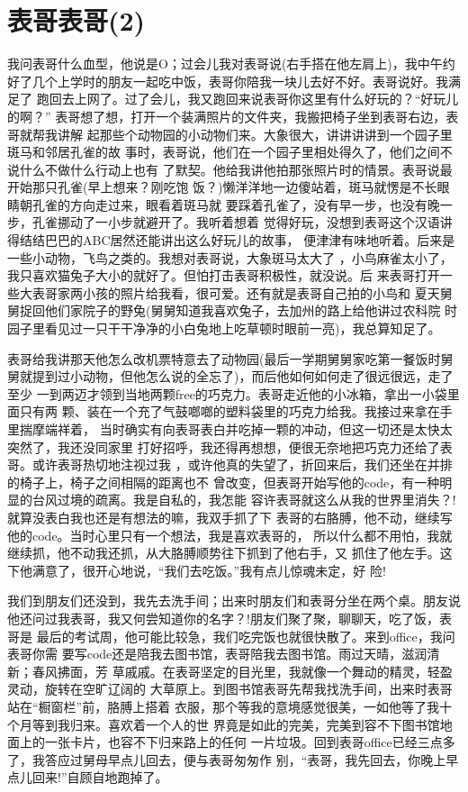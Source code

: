 \documentclass[12pt]{book}
\begin{document}
\section{表哥表哥(2)}
\label{sec-7-4}

       我问表哥什么血型，他说是O；过会儿我对表哥说(右手搭在他左肩上)，我中午约
好了几个上学时的朋友一起吃中饭，表哥你陪我一块儿去好不好。表哥说好。我满足了
跑回去上网了。过了会儿，我又跑回来说表哥你这里有什么好玩的？“好玩儿的啊？”
表哥想了想，打开一个装满照片的文件夹，我搬把椅子坐到表哥右边，表哥就帮我讲解
起那些个动物园的小动物们来。大象很大，讲讲讲讲到一个园子里斑马和邻居孔雀的故
事时，表哥说，他们在一个园子里相处得久了，他们之间不说什么不做什么行动上也有
了默契。他给我讲他拍那张照片时的情景。表哥说最开始那只孔雀(早上想来？刚吃饱
饭？)懒洋洋地一边傻站着，斑马就愣是不长眼睛朝孔雀的方向走过来，眼看着斑马就
要踩着孔雀了，没有早一步，也没有晚一步，孔雀挪动了一小步就避开了。我听着想着
觉得好玩，没想到表哥这个汉语讲得结结巴巴的ABC居然还能讲出这么好玩儿的故事，
便津津有味地听着。后来是一些小动物，飞鸟之类的。我想对表哥说，大象斑马太大了
，小鸟麻雀太小了，我只喜欢猫兔子大小的就好了。但怕打击表哥积极性，就没说。后
来表哥打开一些大表哥家两小孩的照片给我看，很可爱。还有就是表哥自己拍的小鸟和
夏天舅舅捉回他们家院子的野兔(舅舅知道我喜欢兔子，去加州的路上给他讲过农科院
时园子里看见过一只干干净净的小白兔地上吃草顿时眼前一亮)，我总算知足了。

        表哥给我讲那天他怎么改机票特意去了动物园(最后一学期舅舅家吃第一餐饭时舅
舅就提到过小动物，但他怎么说的全忘了)，而后他如何如何走了很远很远，走了至少
一到两迈才领到当地两颗free的巧克力。表哥走近他的小冰箱，拿出一小袋里面只有两
颗、装在一个充了气鼓啷啷的塑料袋里的巧克力给我。我接过来拿在手里揣摩端祥着，
当时确实有向表哥表白并吃掉一颗的冲动，但这一切还是太快太突然了，我还没同家里
打好招呼，我还得再想想，便很无奈地把巧克力还给了表哥。或许表哥热切地注视过我
，或许他真的失望了，折回来后，我们还坐在并排的椅子上，椅子之间相隔的距离也不
曾改变，但表哥开始写他的code，有一种明显的台风过境的疏离。我是自私的，我怎能
容许表哥就这么从我的世界里消失？!就算没表白我也还是有想法的嘛，我双手抓了下
表哥的右胳膊，他不动，继续写他的code。当时心里只有一个想法，我是喜欢表哥的，
所以什么都不用怕，我就继续抓，他不动我还抓，从大胳膊顺势往下抓到了他右手，又
抓住了他左手。这下他满意了，很开心地说，“我们去吃饭。”我有点儿惊魂未定，好
险!

        我们到朋友们还没到，我先去洗手间；出来时朋友们和表哥分坐在两个桌。朋友说
他还问过我表哥，我又何尝知道你的名字？!朋友们聚了聚，聊聊天，吃了饭，表哥是
最后的考试周，他可能比较急，我们吃完饭也就很快散了。来到office，我问表哥你需
要写code还是陪我去图书馆，表哥陪我去图书馆。雨过天晴，滋润清新；春风拂面，芳
草戚戚。在表哥坚定的目光里，我就像一个舞动的精灵，轻盈灵动，旋转在空旷辽阔的
大草原上。到图书馆表哥先帮我找洗手间，出来时表哥站在“橱窗栏”前，胳膊上搭着
衣服，那个等我的意境感觉很美，一如他等了我十个月等到我归来。喜欢着一个人的世
界竟是如此的完美，完美到容不下图书馆地面上的一张卡片，也容不下归来路上的任何
一片垃圾。回到表哥office已经三点多了，我答应过舅母早点儿回去，便与表哥匆匆作
别，“表哥，我先回去，你晚上早点儿回来!”自顾自地跑掉了。
\end{document}
